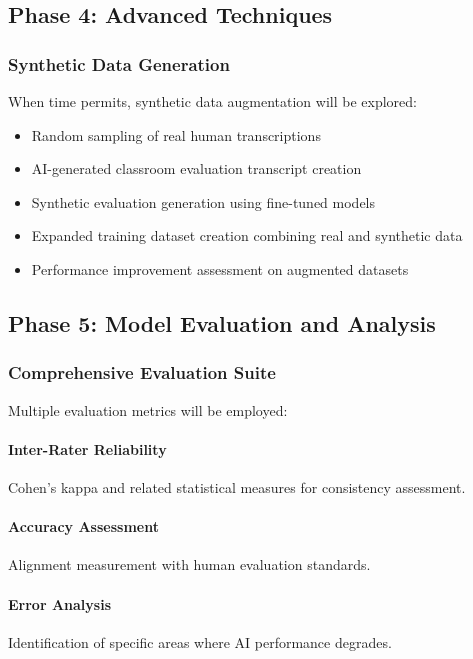 \documentclass[12pt]{article}
\begin{document}
\subsection{Phase 4: Advanced Techniques}

\subsubsection{Synthetic Data Generation}
When time permits, synthetic data augmentation will be explored:
\begin{itemize}
    \item Random sampling of real human transcriptions
    \item AI-generated classroom evaluation transcript creation
    \item Synthetic evaluation generation using fine-tuned models
    \item Expanded training dataset creation combining real and synthetic data
    \item Performance improvement assessment on augmented datasets
\end{itemize}

\subsection{Phase 5: Model Evaluation and Analysis}

\subsubsection{Comprehensive Evaluation Suite}
Multiple evaluation metrics will be employed:

\paragraph{Inter-Rater Reliability} Cohen's kappa and related statistical measures for consistency assessment.

\paragraph{Accuracy Assessment} Alignment measurement with human evaluation standards.

\paragraph{Error Analysis} Identification of specific areas where AI performance degrades.
\end{document}
